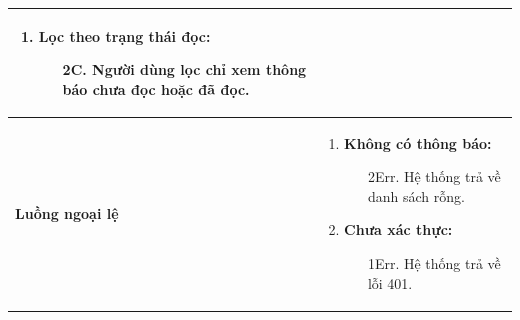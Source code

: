{\begin{tabularx}{\textwidth}{|>{\raggedright\arraybackslash}X|>{\raggedright\arraybackslash}X|}
\begin{enumerate}
\begin{enumerate}
    \end{enumerate}
    \item \textbf{Lọc theo trạng thái đọc:}
    \begin{enumerate}
        \item[2C.] Người dùng lọc chỉ xem thông báo chưa đọc hoặc đã đọc.
    \end{enumerate}
\end{enumerate} \\
\hline
\textbf{Luồng ngoại lệ} &
\begin{enumerate}
    \item \textbf{Không có thông báo:}
    \begin{enumerate}
        \item[2Err.] Hệ thống trả về danh sách rỗng.
    \end{enumerate}
    \item \textbf{Chưa xác thực:}
    \begin{enumerate}
        \item[1Err.] Hệ thống trả về lỗi 401.
    \end{enumerate}
\end{enumerate} \\
\hline
\end{tabularx}
}
